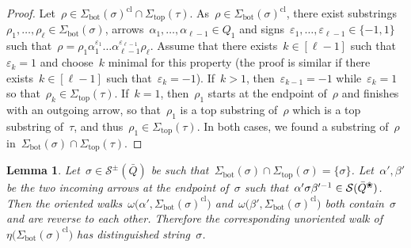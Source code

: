 \documentclass{amsart}
\newtheorem{lemma}[theorem]{Lemma}
\theoremstyle{definition}
\newcommand{\blossom}{^\text{\ding{96}}} %
\newcommand{\strings}{\mathcal{S}} %
\renewcommand{\top}{\mathrm{top}} %
\newcommand{\bottom}{\mathrm{bot}} %
\newcommand{\closure}[1]{#1^{\mathrm{cl}}} %
\begin{document}
\begin{proof}
Let~$\rho \in \closure{\Sigma_\bottom(\sigma)} \cap \Sigma_\top(\tau)$.
As~$\rho \in \closure{\Sigma_\bottom(\sigma)}$, there exist substrings~$\rho_1, \dots, \rho_\ell \in \Sigma_\bottom(\sigma)$, arrows~$\alpha_1, \dots, \alpha_{\ell-1} \in Q_1$ and signs~$\varepsilon_1, \dots, \varepsilon_{\ell-1} \in \{-1,1\}$ such that~$\rho = \rho_1 \alpha_1^{\varepsilon_1} \dots \alpha_{\ell-1}^{\varepsilon_{\ell-1}} \rho_\ell$.
Assume that there exists~$k \in [\ell-1]$ such that~$\varepsilon_k = 1$ and choose~$k$ minimal for this property (the proof is similar if there exists~$k \in [\ell-1]$ such that~$\varepsilon_k = -1$).
If~$k > 1$, then~$\varepsilon_{k-1} = -1$ while~$\varepsilon_k = 1$ so that~$\rho_k \in \Sigma_\top(\tau)$.
If~$k = 1$, then~$\rho_1$ starts at the endpoint of~$\rho$ and finishes with an outgoing arrow, so that~$\rho_1$ is a top substring of~$\rho$ which is a top substring of~$\tau$, and thus~$\rho_1 \in \Sigma_\top(\tau)$.
In both cases, we found a substring of~$\rho$ in~$\Sigma_\bottom(\sigma) \cap \Sigma_\top(\tau)$.
\end{proof}

\begin{lemma}
\label{lem:bijectionDistinguishableStringsWalks}
Let~$\sigma \in \strings^\pm(\bar Q)$ be such that~$\Sigma_\bottom(\sigma) \cap \Sigma_\top(\sigma) = \{\sigma\}$.
Let~$\alpha', \beta'$ be the two incoming arrows at the endpoint of~$\sigma$ such that~$\alpha'\sigma\beta'^{-1} \in \strings(\bar Q\blossom)$.
Then the oriented walks~$\omega \big( \alpha', \closure{\Sigma_\bottom(\sigma)} \big)$ and~$\omega \big( \beta', \closure{\Sigma_\bottom(\sigma)} \big)$ both contain~$\sigma$ and are reverse to each other. Therefore the corresponding unoriented walk of~$\eta \big( \closure{\Sigma_\bottom(\sigma)} \big)$ has distinguished string~$\sigma$.
\end{lemma}
\end{document}
